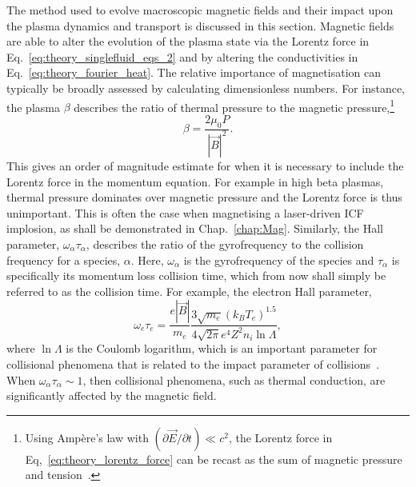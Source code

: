 The method used to evolve macroscopic magnetic fields and their impact upon the plasma dynamics and transport is discussed in this section.
Magnetic fields are able to alter the evolution of the plasma state via the Lorentz force in Eq.~\ref{eq:theory_singlefluid_eqs_2} and by altering the conductivities in Eq.~\ref{eq:theory_fourier_heat}.
The relative importance of magnetisation can typically be broadly assessed by calculating dimensionless numbers.
For instance, the plasma $\beta$ describes the ratio of thermal pressure to the magnetic pressure,\footnote{Using Amp\`ere's law with $(\partial \vec{E} / \partial t) \ll c^2$, the Lorentz force in Eq,~\ref{eq:theory_lorentz_force} can be recast as the sum of magnetic pressure and tension~\cite{oneill_modelling_2023}.}
\begin{equation}
    \beta = \frac{2 \mu_0 P}{|\vec{B}|^2}.
\end{equation}
This gives an order of magnitude estimate for when it is necessary to include the Lorentz force in the momentum equation.
For example in high beta plasmas, thermal pressure dominates over magnetic pressure and the Lorentz force is thus unimportant.
This is often the case when magnetising a laser-driven \ac{ICF} implosion, as shall be demonstrated in Chap.~\ref{chap:Mag}.
Similarly, the Hall parameter, $\omega_\alpha \tau_\alpha$, describes the ratio of the gyrofrequency to the collision frequency for a species, $\alpha$.
Here, $\omega_\alpha$ is the gyrofrequency of the species and $\tau_\alpha$ is specifically its momentum loss collision time, which from now shall simply be referred to as the collision time.
For example, the electron Hall parameter,
\begin{equation}
    \omega_e \tau_e = \frac{e |\vec{B}|}{m_e} \frac{3\sqrt{m_e} (k_B T_e)^{1.5}}{4 \sqrt{2\pi} e^4 Z^2 n_i \ln \Lambda },
\end{equation}
where $\ln\Lambda$ is the Coulomb logarithm, which is an important parameter for collisional phenomena that is related to the impact parameter of collisions~\cite{ramazanov_coulomb_2001,kodanova_investigation_2015,lin_temperature_2023}.
When $\omega_\alpha \tau_\alpha \sim 1$, then collisional phenomena, such as thermal conduction, are significantly affected by the magnetic field.

